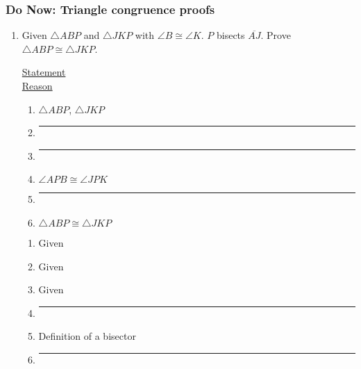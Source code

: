 \documentclass[12pt, twoside]{article}
\begin{document}
\subsubsection*{Do Now: Triangle congruence proofs}
 \begin{enumerate}

\item Given $\triangle ABP$ and $\triangle JKP$ with $\angle B \cong \angle K$. $P$ bisects $\overline{AJ}$. Prove $\triangle ABP \cong \triangle JKP$.\\[0.5cm]

  \begin{multicols}{2}
    \underline{Statement} \\
    \underline{Reason}
  \end{multicols}
  \begin{multicols}{2}
    \raggedcolumns
    \begin{enumerate}[label={\arabic*)}]
      \item $\triangle ABP$, $\triangle JKP$ \vspace{0.3cm}
      \item \rule{4cm}{0.15mm} \vspace{0.3cm}
      \item \rule{4cm}{0.15mm} \vspace{0.3cm}
      \item $\angle APB \cong \angle JPK$  \vspace{0.3cm}
      \item \rule{4cm}{0.15mm} \vspace{0.3cm}
      \item $\triangle ABP \cong \triangle JKP$ \vspace{0.3cm}
    \end{enumerate}
    \begin{enumerate}[label={\arabic*)}]
      \item Given \vspace{0.3cm}
      \item Given \vspace{0.3cm}
      \item Given \vspace{0.3cm}
      \item \rule{4cm}{0.15mm} \vspace{0.3cm}
      \item Definition of a bisector \vspace{0.3cm}
      \item \rule{4cm}{0.15mm} \vspace{0.3cm}
    \end{enumerate}
  \end{multicols}


\end{enumerate}
\end{document}
